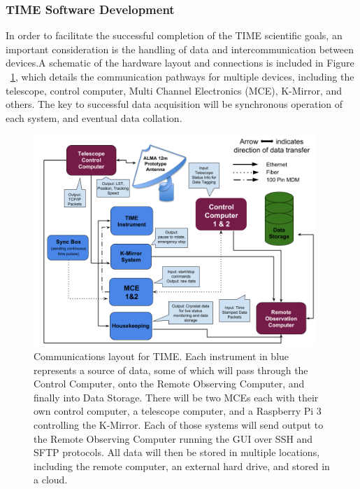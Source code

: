\documentclass[manuscript]{aastex}
\begin{document}
\subsubsection{TIME Software Development}

In order to facilitate the successful completion of the TIME scientific goals, an important consideration is the handling of data and intercommunication between devices.A schematic of the hardware layout and connections is included in Figure ~\ref{fig:km9}, which details the communication pathways for multiple devices, including the telescope, control computer, Multi Channel Electronics (MCE), K-Mirror, and others. The key to successful data acquisition will be synchronous operation of each system, and eventual data collation. 

\begin{figure}[H]
\centering
\captionsetup{width=0.95\textwidth}
\includegraphics[width=0.95\textwidth]{km9.png}
\caption[TIME Control Flow Diagram]{Communications layout for TIME. Each instrument in blue represents a source of data, some of which will pass through the Control Computer, onto the Remote Observing Computer, and finally into Data Storage. There will be two MCEs each with their own control computer, a telescope computer, and a Raspberry Pi 3 controlling the K-Mirror. Each of those systems will send output to the Remote Observing Computer running the GUI over SSH and SFTP protocols. All data will then be stored in multiple locations, including the remote computer, an external hard drive, and stored in a cloud.}
\label{fig:km9}
\end{figure}
 
\end{document}
